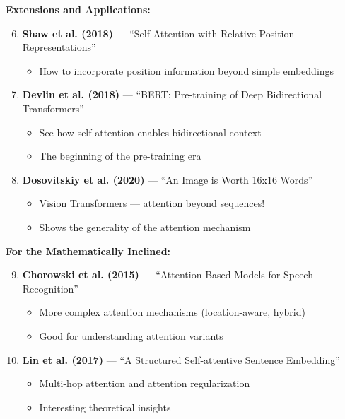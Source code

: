 \documentclass{article}
\begin{document}
\begin{tcolorbox}[colback=gray!5!white, colframe=gray!75!black, title=Recommended Reading List]
\textbf{Extensions and Applications:}
\begin{enumerate}
    \setcounter{enumi}{5}
    \item \textbf{Shaw et al. (2018)} — ``Self-Attention with Relative Position Representations''
    \begin{itemize}
        \item How to incorporate position information beyond simple embeddings
    \end{itemize}

    \item \textbf{Devlin et al. (2018)} — ``BERT: Pre-training of Deep Bidirectional Transformers''
    \begin{itemize}
        \item See how self-attention enables bidirectional context
        \item The beginning of the pre-training era
    \end{itemize}

    \item \textbf{Dosovitskiy et al. (2020)} — ``An Image is Worth 16x16 Words''
    \begin{itemize}
        \item Vision Transformers — attention beyond sequences!
        \item Shows the generality of the attention mechanism
    \end{itemize}
\end{enumerate}

\textbf{For the Mathematically Inclined:}
\begin{enumerate}
    \setcounter{enumi}{8}
    \item \textbf{Chorowski et al. (2015)} — ``Attention-Based Models for Speech Recognition''
    \begin{itemize}
        \item More complex attention mechanisms (location-aware, hybrid)
        \item Good for understanding attention variants
    \end{itemize}

    \item \textbf{Lin et al. (2017)} — ``A Structured Self-attentive Sentence Embedding''
    \begin{itemize}
        \item Multi-hop attention and attention regularization
        \item Interesting theoretical insights
    \end{itemize}
\end{enumerate}
\end{tcolorbox}
\end{document}
